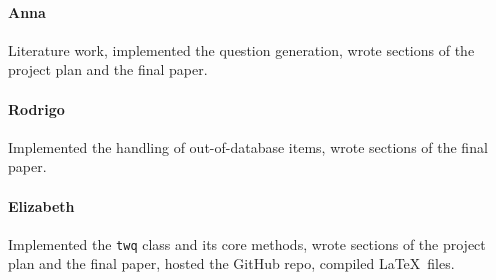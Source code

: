 \documentclass[11pt,a4paper]{article}
\begin{document}
\paragraph{Anna} Literature work, implemented the question generation, wrote sections of the project plan and the final paper.

\paragraph{Rodrigo} Implemented the handling of out-of-database items, wrote sections of the final paper.

\paragraph{Elizabeth} Implemented the \texttt{twq} class and its core methods, wrote sections of the project plan and the final paper, hosted the GitHub repo, compiled \LaTeX\ files.
\end{document}
